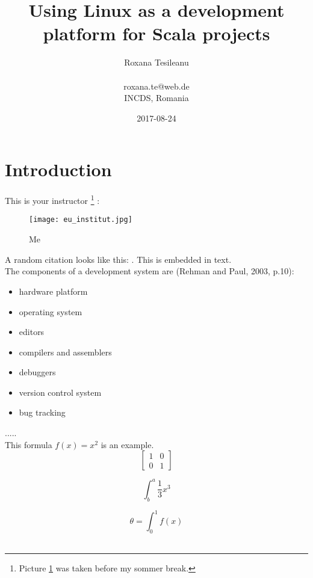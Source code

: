\documentclass{article}
\title{Using Linux as a development platform for Scala projects}
\date{2017-08-24}
\author{Roxana Tesileanu \\ 
\\ 
roxana.te@web.de \\
INCDS, Romania }
\begin{document}
	\maketitle
	\newpage

\tableofcontents
\newpage

\section{Introduction}

This is your instructor \footnote{\label{footnote1}Picture \ref{fig: Roxi} was taken before my sommer break.} : 
\\
\begin{figure} [H]
 \texttt{[image: eu\_institut.jpg]}
 \caption{Me}
 \label{fig: Roxi}
\end{figure}


\newpage
A random citation looks like this:
\cite{odersky_programming_2010}. This is embedded in text. \\

The components of a development system are (Rehman and Paul, 2003, p.10):\newline
\begin{itemize}
\item  hardware platform 
\item  operating system 
\item  editors 
\item  compilers and assemblers 
\item  debuggers 
\item  version control system 
\item  bug tracking 
\end{itemize}

..... \\

This formula $f(x) = x^2$ is an example.
\begin{equation}
\left[
\begin{matrix}
1 & 0 \\
0 & 1
\end{matrix}
\right]
\end{equation}

\begin{equation}
\int^a_b\frac{1}{3}x^3
\end{equation}

\begin{equation}
\theta = \int^1_0 f(x)
\end{equation}
\\
\end{document}
